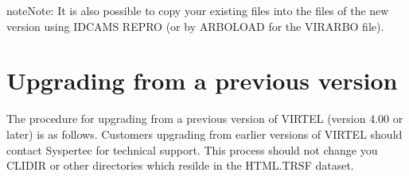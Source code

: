 \documentclass[letterpaper,10pt,english]{sphinxmanual}
\begin{document}
\sphinxAtStartPar
{}

\begin{sphinxadmonition}{note}{Note:}
\sphinxAtStartPar
It is also possible to copy your existing files into the files of the new version using IDCAMS REPRO (or by ARBOLOAD for the VIRARBO file).
\end{sphinxadmonition}

\newpage

\ignorespaces 

\section{Upgrading from a previous version}
\label{\detokenize{Installation_Guide:index-6}}\label{\detokenize{Installation_Guide:id2}}
\sphinxAtStartPar
The procedure for upgrading from a previous version of VIRTEL (version 4.00 or later) is as follows. Customers upgrading from earlier versions of VIRTEL should contact Syspertec for technical support. This process should not change you CLI\sphinxhyphen{}DIR or other directories which resilde in the HTML.TRSF dataset.
\end{document}
